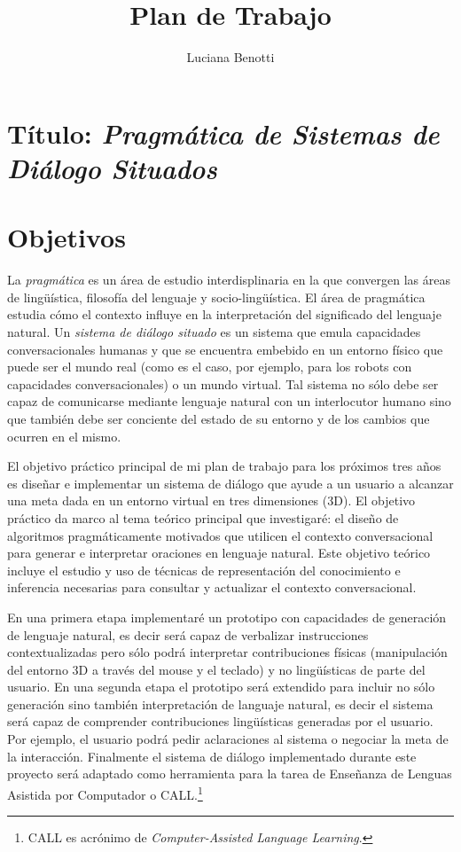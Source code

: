 \documentclass[11pt]{article}
\title{Plan de Trabajo}
\author{Luciana Benotti}
\begin{document}
\maketitle

\section*{T\'itulo: \emph{Pragm\'atica de Sistemas de Di\'alogo Situados}} 

\section{Objetivos} \label{objetivos}

La \emph{pragm\'atica} es un \'area de
estudio interdisplinaria en la que convergen las \'areas de ling\"u\'istica,
filosof\'ia
del lenguaje y socio-ling\"u\'istica. El \'area de pragm\'atica
estudia c\'omo el contexto influye en la interpretaci\'on del significado del
lenguaje natural. Un \emph{sistema de di\'alogo situado} es un sistema que emula
capacidades conversacionales humanas y que se encuentra
embebido en un entorno f\'isico que puede ser el mundo real (como es el caso,
por ejemplo, para los robots con capacidades conversacionales) o un mundo
virtual. Tal sistema no s\'olo debe ser capaz de comunicarse mediante
lenguaje natural con un interlocutor humano sino que tambi\'en debe ser
conciente
del estado de su entorno y de los cambios que ocurren en el mismo. 

El objetivo pr\'actico principal de mi plan de trabajo para los pr\'oximos tres
a\~nos es dise\~nar e implementar un sistema de di\'alogo que ayude a un usuario
a alcanzar una meta dada en un entorno virtual en tres dimensiones (3D). 
El objetivo pr\'actico da marco al tema te\'orico principal que investigar\'e:
el dise\~no de algoritmos pragm\'aticamente motivados que utilicen el
contexto conversacional para generar e interpretar oraciones en lenguaje
natural. Este objetivo te\'orico incluye el estudio y uso de t\'ecnicas de
representaci\'on del conocimiento e inferencia necesarias para consultar y
actualizar el contexto conversacional. 

En una primera etapa implementar\'e un prototipo con
capacidades de generaci\'on de lenguaje natural, es decir
ser\'a capaz de verbalizar instrucciones contextualizadas pero s\'olo podr\'a
interpretar contribuciones f\'isicas (manipulaci\'on del entorno 3D a trav\'es
del mouse y el teclado) y no ling\"u\'isticas de parte del usuario. En una
segunda etapa el prototipo ser\'a extendido para incluir no
s\'olo generaci\'on sino tambi\'en interpretaci\'on de languaje natural, es
decir el sistema ser\'a capaz de
comprender contribuciones ling\"u\'isticas generadas por el usuario. Por
ejemplo, el usuario podr\'a pedir aclaraciones al sistema o negociar la meta
de la interacci\'on. Finalmente el sistema de di\'alogo
implementado durante este proyecto ser\'a adaptado como herramienta para la
tarea de Ense\~nanza de Lenguas Asistida por Computador o CALL.\footnote{CALL es
acr\'onimo de \emph{Computer-Assisted Language
Learning}.}  
\end{document}
